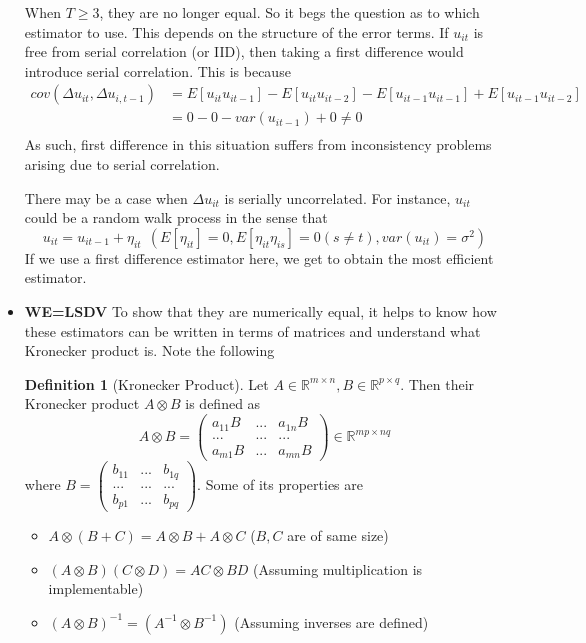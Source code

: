 \documentclass[12pt]{article}
\theoremstyle{definition}
\newtheorem{definition}{Definition}[section]
\theoremstyle{property}
\theoremstyle{assumption}
\theoremstyle{example}
\theoremstyle{comment}
\begin{document}
\begin{itemize}
When $T\geq3$, they are no longer equal. So it begs the question as to which estimator to use. This depends on the structure of the error terms. If $u_{it}$ is free from serial correlation (or IID), then taking a first difference would introduce serial correlation. This is because
\[
\begin{aligned}
cov(\Delta u_{it},\Delta u_{i,t-1})&=E[u_{it}u_{it-1}]-E[u_{it}u_{it-2}]-E[u_{it-1}u_{it-1}]+E[u_{it-1}u_{it-2}]\\
&=0-0-var(u_{it-1})+0\neq 0 \\
\end{aligned}
\]
As such, first difference in this situation suffers from inconsistency problems arising due to serial correlation. \par
There may be a case when $\Delta u_{it}$ is serially uncorrelated. For instance, $u_{it}$ could be a random walk process in the sense that
\[
u_{it}=u_{it-1}+\eta_{it} \ \ (E[\eta_{it}]=0, E[\eta_{it}\eta_{is}]=0 (s\neq t), var(u_{it})=\sigma^2)
\]
If we use a first difference estimator here, we get to obtain the most efficient estimator. 
\item \textbf{WE=LSDV} To show that they are numerically equal, it helps to know how these estimators can be written in terms of matrices and understand what Kronecker product is. Note the following
\begin{mdframed}[backgroundcolor=blue!5] 
\begin{definition}[Kronecker Product] 
Let $A\in\mathbb{R}^{m\times n}, B\in\mathbb{R}^{p\times q}$. Then their Kronecker product $A\otimes B$ is defined as
\[
A\otimes B = \begin{pmatrix}a_{11}B & ... &a_{1n}B\\ ...&...&...\\a_{m1}B &...&a_{mn}B \end{pmatrix}\in\mathbb{R}^{mp\times nq}
\]
where $B=\begin{pmatrix}b_{11} & ... &b_{1q}\\ ...&...&...\\b_{p1} &...&b_{pq} \end{pmatrix}$. Some of its properties are
\begin{itemize}
\item $A\otimes(B+C)=A\otimes B + A\otimes C$ ($B,C$ are of same size)
\item $(A\otimes B)(C\otimes D)=AC\otimes BD$ (Assuming multiplication is implementable)
\item $(A\otimes B)^{-1}= (A^{-1}\otimes B^{-1})$ (Assuming inverses are defined)

\end{itemize}
\end{definition}
\end{mdframed}
\end{itemize}
\end{document}
